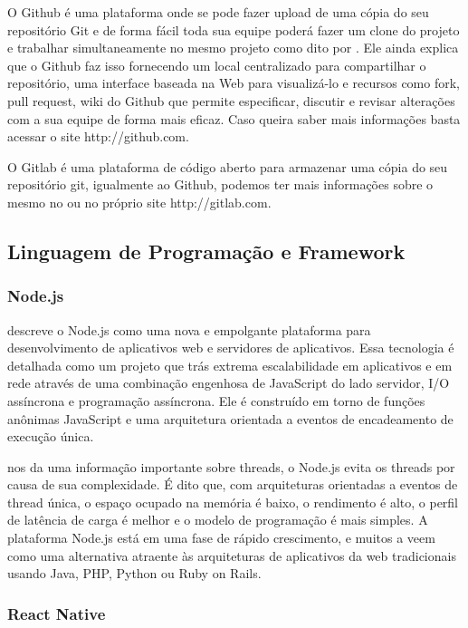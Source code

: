 O Github é uma plataforma onde se pode fazer upload de uma cópia do seu repositório Git e de forma fácil toda sua equipe poderá fazer um clone do projeto e trabalhar simultaneamente no mesmo projeto como dito por \cite{Beer2018}. Ele ainda explica que o Github faz isso fornecendo um local centralizado para compartilhar o repositório, uma interface baseada na Web para visualizá-lo e recursos como fork, pull request, wiki do Github que permite especificar, discutir e revisar alterações com a sua equipe de forma mais eficaz. Caso queira saber mais informações basta acessar o site http://github.com.


O Gitlab é uma plataforma de código aberto para armazenar uma cópia do seu repositório git, igualmente ao Github, podemos ter mais informações sobre o mesmo no \cite{Baarsen2014} ou no próprio site http://gitlab.com.

\subsection{Linguagem de Programação e Framework}

\subsubsection{ Node.js }

\cite{Herron2018} descreve o Node.js como uma nova e empolgante plataforma para desenvolvimento de aplicativos web e servidores de aplicativos. Essa tecnologia é detalhada como um projeto que trás extrema escalabilidade em aplicativos e em rede através de uma combinação engenhosa de JavaScript do lado servidor, I/O assíncrona e programação assíncrona. Ele é construído em torno de funções anônimas JavaScript e uma arquitetura orientada a eventos de encadeamento de execução única.

\cite{Herron2018} nos da uma informação importante sobre threads, o Node.js evita os threads por causa de sua complexidade. É dito que, com arquiteturas orientadas a eventos de thread única, o espaço ocupado na memória é baixo, o rendimento é alto, o perfil de latência de carga é melhor e o modelo de programação é mais simples. A plataforma Node.js está em uma fase de rápido crescimento, e muitos a veem como uma alternativa atraente às arquiteturas de aplicativos da web tradicionais usando Java, PHP, Python ou Ruby on Rails.

\subsubsection{React Native}

